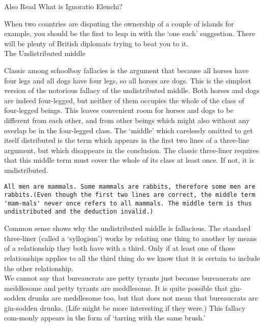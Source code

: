 \documentclass[a4paper,12pt,single,pdftex]{scrartcl}
\begin{document}
    
      

      
        Also Read  What is Ignoratio Elenchi?
      
    
    
      When two countries are disputing the ownership of a couple of islands for example, you should be the first to leap in with the ‘one each’ suggestion. There will be plenty of British diplomats trying to beat you to it.
    \\

  

The Undistributed middle
    
      Classic among schoolboy fallacies is the argument that because all horses have four legs and all dogs have four legs, so all horses are dogs. This is the simplest version of the notorious fallacy of the undistributed middle. Both horses and dogs are indeed four-legged, but neither of them occupies the whole of the class of four-legged beings. This leaves convenient room for horses and dogs to be different from each other, and from other beings which might also without any overlap be in the four-legged class. The ‘middle’ which carelessly omitted to get itself distributed is the term which appears in the first two lines of a three-line argument, but which disappears in the conclusion. The classic three-liner requires that this middle term must cover the whole of its class at least once. If not, it is undistributed.
    \\

    \begin{verbatim}All men are mammals. Some mammals are rabbits, therefore some men are rabbits.(Even though the first two lines are correct, the middle term 'mam-mals' never once refers to all mammals. The middle term is thus undistributed and the deduction invalid.)\end{verbatim}
    
      Common sense shows why the undistributed middle is fallacious. The standard three-liner (called a ‘syllogism’) works by relating one thing to another by means of a relationship they both have with a third. Only if at least one of those relationships applies to all the third thing do we know that it is certain to include the other relationship.
    \\

    
      We cannot say that bureaucrats are petty tyrants just because bureaucrats are meddlesome and petty tyrants are meddlesome. It is quite possible that gin-sodden drunks are meddlesome too, but that does not mean that bureaucrats are gin-sodden drunks. (Life might be more interesting if they were.) This fallacy com-monly appears in the form of ‘tarring with the same brush.’
    \\
\end{document}
